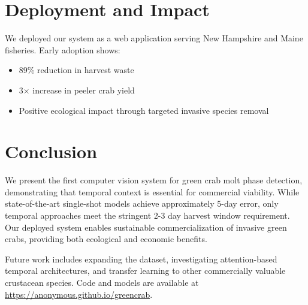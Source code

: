 \documentclass[10pt,twocolumn,letterpaper]{article}
\begin{document}
\section{Deployment and Impact}

We deployed our system as a web application serving New Hampshire and Maine fisheries. Early adoption shows:
\begin{itemize}
\item 89\% reduction in harvest waste
\item 3× increase in peeler crab yield
\item Positive ecological impact through targeted invasive species removal
\end{itemize}

\section{Conclusion}

We present the first computer vision system for green crab molt phase detection, demonstrating that temporal context is essential for commercial viability. While state-of-the-art single-shot models achieve approximately 5-day error, only temporal approaches meet the stringent 2-3 day harvest window requirement. Our deployed system enables sustainable commercialization of invasive green crabs, providing both ecological and economic benefits.

Future work includes expanding the dataset, investigating attention-based temporal architectures, and transfer learning to other commercially valuable crustacean species. Code and models are available at \url{https://anonymous.github.io/greencrab}.
\end{document}
